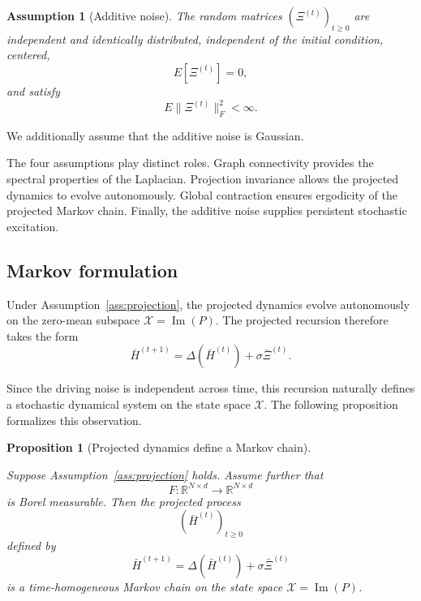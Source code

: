 \documentclass{article}
\newtheorem{proposition}[theorem]{Proposition}
\newtheorem{assumption}{Assumption}[section]
\begin{document}

\begin{assumption}[Additive noise]
	\label{ass:noise}	
	The random matrices
	$(\Xi^{(t)})_{t\ge0}$
	are independent and identically distributed,
	independent of the initial condition,
	centered,	
	\[
	E[\Xi^{(t)}]=0,
	\]	
	and satisfy
	\[
	E\|\Xi^{(t)}\|_F^2<\infty.
	\]	
\end{assumption}
We additionally assume that the additive noise is Gaussian.


The four assumptions play distinct roles. Graph connectivity provides the spectral properties of the Laplacian. Projection invariance allows the projected dynamics to evolve autonomously. Global contraction ensures ergodicity of the projected Markov chain. Finally, the additive noise supplies persistent stochastic excitation.


\subsection{Markov formulation}

Under Assumption~\ref{ass:projection}, the projected dynamics evolve
autonomously on the zero-mean subspace
\(
\mathcal X
=
\operatorname{Im}(P)
\).
The projected recursion therefore takes the form
\[
\boxed{
	\bar H^{(t+1)}
	=
	\Delta(\bar H^{(t)})
	+
	\sigma\bar\Xi^{(t)}.
}
\]

Since the driving noise is independent across time, this recursion
naturally defines a stochastic dynamical system on the state space
\(\mathcal X\).
The following proposition formalizes this observation.

\begin{proposition}[Projected dynamics define a Markov chain]
	\label{prop:markov}
	
	Suppose Assumption~\ref{ass:projection} holds.
	Assume further that
	\[
	F:\mathbb{R}^{N\times d}\rightarrow\mathbb{R}^{N\times d}
	\]
	is Borel measurable.
	Then the projected process
	\[
	(\bar H^{(t)})_{t\ge0}
	\]
	defined by
	\[
	\bar H^{(t+1)}
	=
	\Delta(\bar H^{(t)})
	+
	\sigma\bar\Xi^{(t)}
	\]
	is a time-homogeneous Markov chain on the state space
	\(
	\mathcal X=\operatorname{Im}(P)
	\).
\end{proposition}
\end{document}
